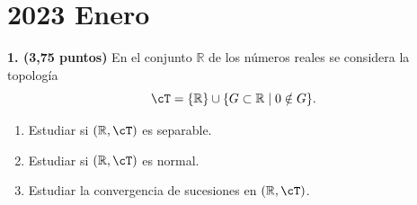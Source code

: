 \clearpage
\chapter*{2023 Enero}

\begin{enunciado}
    \hypertarget{2023 A 1}{}
    \textbf{1. (3,75 puntos)} En el conjunto \(\mathbb{R}\) de los números reales se considera la topología
    \[
        \cT = \{\mathbb{R}\} \cup \{G \subset \mathbb{R} \mid 0 \notin G\}.
    \]
    \begin{enumerate}[label=\alph*)]
        \item Estudiar si \((\mathbb{R}, \cT)\) es separable.
        \item Estudiar si \((\mathbb{R}, \cT)\) es normal.
        \item Estudiar la convergencia de sucesiones en \((\mathbb{R}, \cT)\).
    \end{enumerate}
\end{enunciado}

